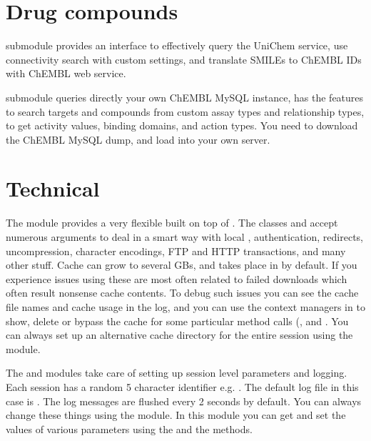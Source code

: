\documentclass[letterpaper,10pt,english]{sphinxmanual}
\begin{document}
\section{Drug compounds}
\label{\detokenize{index:drug-compounds}}
 submodule provides an interface to effectively query the UniChem
service, use connectivity search with custom settings, and translate SMILEs to
ChEMBL IDs with ChEMBL web service.

 submodule queries directly your own ChEMBL MySQL instance, has the
features to search targets and compounds from custom assay types and
relationship types, to get activity values, binding domains, and action types.
You need to download the ChEMBL MySQL dump, and load into your own server.


\section{Technical}
\label{\detokenize{index:technical}}
The module  provides a very flexible 
built on top of . The classes  and
 accept numerous arguments to deal in a smart
way with local , authentication, redirects, uncompression, character
encodings, FTP and HTTP transactions, and many other stuff. Cache can grow to
several GBs, and takes place in  by default. If you
experience issues using  these are most often related to failed
downloads which often result nonsense cache contents. To debug such issues
you can see the cache file names and cache usage in the log, and you can use
the context managers in  to show, delete or bypass the cache
for some particular method calls (,
 and .
You can always set up an alternative cache directory for the entire session
using the  module.

The  and  modules take care of setting up
session level parameters and logging. Each session has a random 5 character
identifier e.g. . The default log file in this case is
. The log messages are flushed every 2 seconds
by default. You can always change these things using the  module.
In this module you can get and set the values of various parameters using
the  and the  methods.
\end{document}
